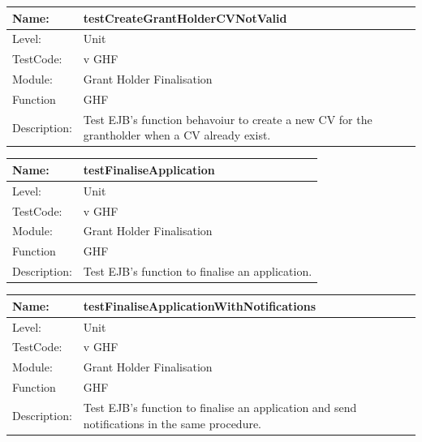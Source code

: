 \documentclass[12pt]{article}
\begin{document}
\begin{center}
\begin{tabular}{|l|p{12cm}|}
\hline

 Name: & testCreateGrantHolderCVNotValid  \\
\hline
Level: & Unit \\
\hline
TestCode: & v GHF \\
\hline
Module:& Grant Holder Finalisation \\
\hline
Function & GHF \\
\hline
Description: & Test EJB's function behavoiur to create a new CV for the grantholder when a CV already exist. \\
\hline
\end{tabular}
\end{center}

\begin{center}
\begin{tabular}{|l|p{12cm}|}
\hline

 Name: & testFinaliseApplication  \\
\hline
Level: & Unit \\
\hline
TestCode: & v GHF \\
\hline
Module:& Grant Holder Finalisation \\
\hline
Function & GHF \\
\hline
Description: & Test EJB's function to finalise an application. \\
\hline
\end{tabular}
\end{center}

\begin{center}
\begin{tabular}{|l|p{12cm}|}
\hline

 Name: & testFinaliseApplicationWithNotifications  \\
\hline
Level: & Unit \\
\hline
TestCode: & v GHF \\
\hline
Module:& Grant Holder Finalisation \\
\hline
Function & GHF \\
\hline
Description: & Test EJB's function to finalise an application and send notifications in the same procedure. \\
\hline
\end{tabular}
\end{center}
\end{document}
